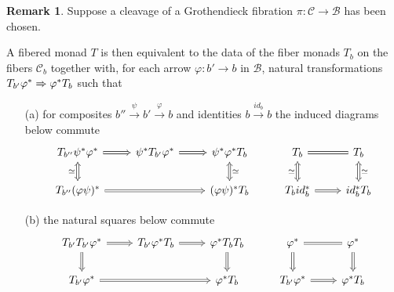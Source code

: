 \documentclass[a4paper,10pt
,draft
]{article}%
\numberwithin{equation}{section}
\numberwithin{figure}{section}
\theoremstyle{definition} %
\newtheorem{remark}[equation]{Remark}%
\newcommand{\1}{\ensuremath{\mathbbm 1}}%
\begin{document}
\begin{remark}\label{FIBMONCL REM}
Suppose a cleavage of a Grothendieck fibration
$\pi \colon \mathcal{C} \to \mathcal{B}$ 
has been chosen.

A fibered monad $T$ is then equivalent to the data of the fiber monads 
$T_b$ on the fibers $\mathcal{C}_b$ together with,
for each arrow $\varphi \colon b' \to b$ in $\mathcal{B}$,
natural transformations
$T_{b'} \varphi^{\**} \Rightarrow \varphi^{\**} T_{b}$
such that
\begin{itemize}
\item[(a)]
for composites $b'' \xrightarrow{\psi} b' \xrightarrow{\varphi} b$
and identities $b \xrightarrow{id_b} b$
the induced diagrams below commute
\begin{equation}\label{GROTHASS EQ}
\begin{tikzcd}
	T_{b''} \psi^{\**} \varphi^{\**} 
	\ar[Rightarrow]{r} \ar[Leftrightarrow]{d}[swap]{\simeq} &
	\psi^{\**} T_{b'} \varphi^{\**} \ar[Rightarrow]{r} &
	\psi^{\**} \varphi^{\**}  T_{b} \ar[Leftrightarrow]{d}{\simeq} &
	T_b \ar[equal]{r} \ar[Leftrightarrow]{d}[swap]{\simeq} &
	T_b \ar[Leftrightarrow]{d}{\simeq}
\\
	T_{b''} (\varphi \psi)^{\**} \ar[Rightarrow]{rr}{} &&
	(\varphi \psi)^{\**} T_{b} &
	T_b id_b^{\**} \ar[Rightarrow]{r}{} &
	id_b^{\**} T_{b}
\end{tikzcd}
\end{equation}
\item[(b)] the natural squares below commute 
\begin{equation}\label{GROTHCART EQ}
\begin{tikzcd}
	T_{b'} T_{b'} \varphi^{\**} \ar[Rightarrow]{r} \ar[Rightarrow]{d}[swap]{} &
	T_{b'} \varphi^{\**} T_{b} \ar[Rightarrow]{r} &
	\varphi^{\**} T_{b} T_{b} \ar[Rightarrow]{d}{} &
	\varphi^{\**} \ar[equal]{r} \ar[Rightarrow]{d}&
	\varphi^{\**} \ar[Rightarrow]{d}
\\
	T_{b'} \varphi^{\**} \ar[Rightarrow]{rr}{} &&
	\varphi^{\**} T_{b} &
	T_{b'} \varphi^{\**} \ar[Rightarrow]{r}{} &
	\varphi^{\**} T_{b}
\end{tikzcd}
\end{equation}
\end{itemize}
\end{remark}
\end{document}
